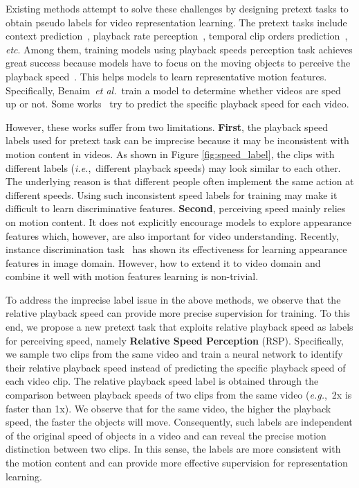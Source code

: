 \documentclass[final]{cvpr}
\def\etal{{\em et al.\/}\, }
\def\ie{\mbox{\textit{i.e.}, }}
\def\eg{\mbox{\textit{e.g.}, }}
\begin{document}
Existing methods attempt to solve these challenges by designing pretext tasks to obtain pseudo labels for video representation learning. The pretext tasks include context prediction~\cite{HanXZ19}, playback rate perception~\cite{speednet}, temporal clip orders prediction~\cite{xu2019self}, \textit{etc}.
Among them, training models using playback speeds perception task achieves great success because models have to focus on the moving objects to perceive the playback speed~\cite{pace}. This helps models to learn representative motion features. Specifically, Benaim~\etal\cite{speednet} train a model to determine whether videos are sped up or not. Some works~\cite{oops,PRP,pace} try to predict the specific playback speed for each video. 


However, these works suffer from two limitations. 
\textbf{First}, the playback speed labels used for pretext task can be imprecise because it may be inconsistent with motion content in videos. As shown in Figure \ref{fig:speed_label}, the clips with different labels (\ie different playback speeds) may look similar to each other.
The underlying reason is that different people often implement the same action at different speeds. Using such inconsistent speed labels for training may make it difficult to learn discriminative features. 
\textbf{Second}, perceiving speed mainly relies on motion content. It does not explicitly encourage models to explore appearance features which, however, are also important for video understanding.
Recently, instance discrimination task~\cite{wu2018unsupervised,he2019momentum} has shown its effectiveness for learning appearance features in image domain. However, how to extend it to video domain and combine it well with motion features learning is non-trivial.


To address the imprecise label issue in the above methods, we observe that the relative playback speed can provide more precise supervision for training. To this end, we propose a new pretext task that exploits relative playback speed as labels for perceiving speed, namely \textbf{Relative Speed Perception} (RSP). 
Specifically, we sample two clips from the same video and train a neural network to identify their relative playback speed instead of predicting the specific playback speed of each video clip. 
The relative playback speed label is obtained through the comparison between playback speeds of two clips from the same video (\eg 2x is faster than 1x). 
We observe that for the same video, the higher the playback speed, the faster the objects will move.
Consequently, such labels are independent of the original speed of objects in a video and can reveal the precise motion distinction between two clips. In this sense, the labels are more consistent with the motion content and can provide more effective supervision for representation learning.
\end{document}
